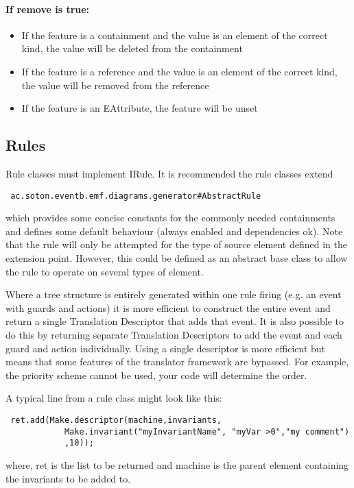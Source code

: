 \paragraph{If remove is true:}
\begin{itemize}
	\item If the feature is a containment and the value is an element of the correct kind, the value will be deleted from the containment
	\item If the feature is a reference and the value is an element of the correct kind, the value will be removed from the reference
	\item If the feature is an EAttribute, the feature will be unset 
\end{itemize}

\subsection{Rules}
\label{sec:rules}

Rule classes must implement IRule. It is recommended the rule classes extend
 \begin{verbatim}
 ac.soton.eventb.emf.diagrams.generator#AbstractRule
 \end{verbatim}
 which provides some concise constants for the commonly needed containments and defines some default behaviour (always enabled and dependencies ok).  Note that the rule will only be attempted for the type of source element defined in the extension point. However, this could be defined as an abstract base class to allow the rule to operate on several types of element.

Where a tree structure is entirely generated within one rule firing (e.g. an event with guards and actions) it is more efficient to construct the entire event and return a single Translation Descriptor that adds that event. It is also possible to do this by returning separate Translation Descriptors to add the event and each guard and action individually. Using a single descriptor is more efficient but means that some features of the translator framework are bypassed. For example, the priority scheme cannot be used, your code will determine the order. 

A typical line from a rule class might look like this:
 \begin{verbatim}
 ret.add(Make.descriptor(machine,invariants,
			Make.invariant("myInvariantName", "myVar >0","my comment")
			,10));
 \end{verbatim}		
where,  ret is the list to be returned and machine is the parent element containing the invariants to be added to.

